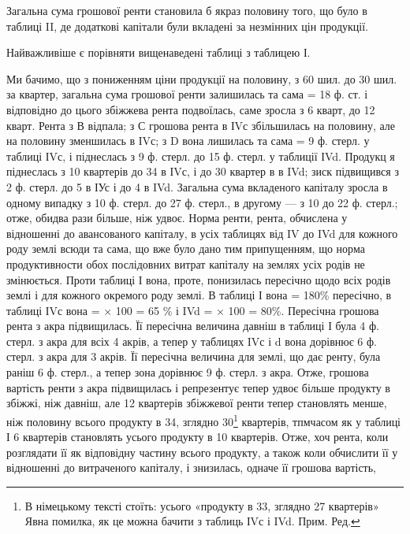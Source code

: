 Загальна сума грошової ренти становила б якраз половину того, що було
в таблиці II, де додаткові капітали були вкладені за незмінних цін продукції.

Найважливіше є порівняти вищенаведені таблиці з таблицею І.

Ми бачимо, що з пониженням ціни продукції на половину, з 60 шил. до
30 шил. за квартер, загальна сума грошової ренти залишилась та сама = 18 ф.
ст. і відповідно до цього збіжжева рента подвоїлась, саме зросла з 6 кварт, до
12 кварт. Рента з В відпала; з С грошова рента в ІVс збільшилась на половину,
але на половину зменшилась в ІVс; з D вона лишилась та сама = 9 ф.
стерл. у таблиці ІVс, і піднеслась з 9 ф. стерл. до 15 ф. стерл. у таблиції ІVd.
Продукц я піднеслась з 10 квартерів до 34 в ІVс, і до 30 квартер в в IVd;
зиск підвищився з 2 ф. стерл. до 5  в ІУс і до 4  в IVd. Загальна сума
вкладеного капіталу зросла в одному випадку з 10 ф. стерл. до 27  ф. стерл.,
в другому — з 10 до 22  ф. стерл.; отже, обидва рази більше, ніж удвоє. Норма
ренти, рента, обчислена у відношенні до авансованого капіталу, в усіх таблицях
від IV до IVd для кожного роду землі всюди та сама, що вже було дано тим припущенням,
що норма продуктивности обох послідовних витрат капіталу на землях
усіх родів не змінюється. Проти таблиці І вона, проте, понизилась пересічно
щодо всіх родів землі і для кожного окремого роду землі. В таблиці І вона =
180\% пересічно, в таблиці ІVс вона = × 100 = 65  \% і IVd =
× 100 = 80\%. Пересічна грошова рента з акра підвищилась. Її пересічна
величина давніш в таблиці І була 4  ф. стерл. з акра для всіх 4 акрів,
а тепер у таблицях IVс і d вона дорівнює 6 ф. стерл. з акра для 3 акрів.
Її пересічна величина для землі, що дає ренту, була раніш 6 ф. стерл., а тепер
зона дорівнює 9 ф. стерл. з акра. Отже, грошова вартість ренти з акра підвищилась
і репрезентує тепер удвоє більше продукту в збіжжі, ніж давніш, але
12 квартерів збіжжевої ренти тепер становлять менше, ніж половину всього продукту
в 34, зглядно 30\footnote*{В німецькому тексті стоїть: усього «продукту в 33, зглядно 27 квартерів» Явна помилка,
як це можна бачити з таблиць ІVс і IVd. Прим. Ред.} квартерів, тпмчасом як у таблиці І 6 квартерів становлять
  усього продукту в 10 квартерів. Отже, хоч рента, коли розглядати
її як відповідну частину всього продукту, а також коли обчислити її у відношенні
до витраченого капіталу, і знизилась, одначе її грошова вартість,
